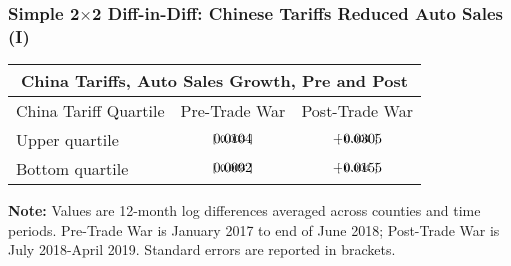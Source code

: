 \documentclass[9pt,pdftex,aspectratio=1610]{beamer}
\theoremstyle{definition}
\begin{document}
\begin{frame}[t]
\frametitle{Simple 2$\times$2 Diff-in-Diff: Chinese Tariffs Reduced Auto Sales (I)}
\begin{table}[t]
\footnotesize
\setlength {\tabcolsep}{6.05mm}
\renewcommand{\arraystretch}{2.30}
\begin{center}
\begin{tabular}{l c c }
\multicolumn{3}{c}{\small \textbf{China Tariffs, Auto Sales Growth, Pre and Post}}\\
\hline
\hline
\footnotesize  China Tariff Quartile & \footnotesize  Pre-Trade War &  \footnotesize  Post-Trade War\\
\hline
\footnotesize  Upper quartile  & $\begin{array}{c}0.0104 \vspace{-.45cm}\\ \scriptstyle [ \ 0.003 \ ]\end{array}$   & $\begin{array}{c}-0.0305 \vspace{-.45cm}\\ \scriptstyle [ \ 0.004 \ ]\end{array}$ \\
\footnotesize  Bottom quartile  & $\begin{array}{c}0.0092 \vspace{-.45cm}\\ \scriptstyle [ \ 0.003 \ ]\end{array}$  & $\begin{array}{c}-0.0155\vspace{-.45cm}\\ \scriptstyle [ \ 0.004 \ ]\end{array}$\\
\hline
\end{tabular}
\parbox[c]{3.65in}{\vspace{.1cm}
{\footnotesize \textbf{Note:} Values  are 12-month log differences averaged across counties and time periods. Pre-Trade War is January 2017 to end of June 2018; Post-Trade War is July 2018-April 2019. Standard errors are reported in brackets.}}
\end{center}
\end{table}
\end{frame}

\end{document}
